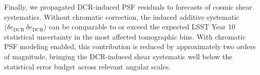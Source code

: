 Finally, we propagated DCR-induced PSF residuals to forecasts of cosmic shear systematics. Without chromatic correction, the induced additive systematic $\langle \delta e_{\mathrm{DCR}} \, \delta e_{\mathrm{DCR}} \rangle$ can be comparable to or exceed the expected LSST Year 10 statistical uncertainty in the most affected tomographic bins. With chromatic PSF modeling enabled, this contribution is reduced by approximately two orders of magnitude, bringing the DCR-induced shear systematic well below the statistical error budget across relevant angular scales.
